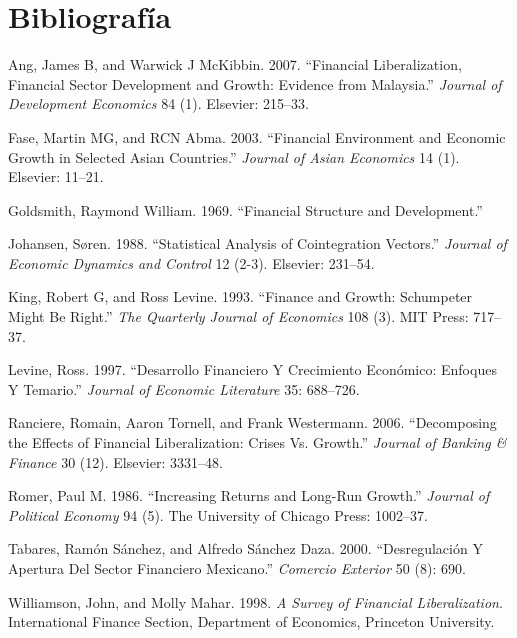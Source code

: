 \documentclass[]{AEA}
\begin{document}



\section{Bibliografía}

\hypertarget{refs}{}
\leavevmode\hypertarget{ref-ang2007financial}{}%
Ang, James B, and Warwick J McKibbin. 2007. ``Financial Liberalization,
Financial Sector Development and Growth: Evidence from Malaysia.''
\emph{Journal of Development Economics} 84 (1). Elsevier: 215--33.

\leavevmode\hypertarget{ref-fase2003financial}{}%
Fase, Martin MG, and RCN Abma. 2003. ``Financial Environment and
Economic Growth in Selected Asian Countries.'' \emph{Journal of Asian
Economics} 14 (1). Elsevier: 11--21.

\leavevmode\hypertarget{ref-goldsmith1969financial}{}%
Goldsmith, Raymond William. 1969. ``Financial Structure and
Development.''

\leavevmode\hypertarget{ref-johansen1988statistical}{}%
Johansen, Søren. 1988. ``Statistical Analysis of Cointegration
Vectors.'' \emph{Journal of Economic Dynamics and Control} 12 (2-3).
Elsevier: 231--54.

\leavevmode\hypertarget{ref-king1993finance}{}%
King, Robert G, and Ross Levine. 1993. ``Finance and Growth: Schumpeter
Might Be Right.'' \emph{The Quarterly Journal of Economics} 108 (3). MIT
Press: 717--37.

\leavevmode\hypertarget{ref-levine1997desarrollo}{}%
Levine, Ross. 1997. ``Desarrollo Financiero Y Crecimiento Económico:
Enfoques Y Temario.'' \emph{Journal of Economic Literature} 35:
688--726.

\leavevmode\hypertarget{ref-ranciere2006decomposing}{}%
Ranciere, Romain, Aaron Tornell, and Frank Westermann. 2006.
``Decomposing the Effects of Financial Liberalization: Crises Vs.
Growth.'' \emph{Journal of Banking \& Finance} 30 (12). Elsevier:
3331--48.

\leavevmode\hypertarget{ref-romer1986increasing}{}%
Romer, Paul M. 1986. ``Increasing Returns and Long-Run Growth.''
\emph{Journal of Political Economy} 94 (5). The University of Chicago
Press: 1002--37.

\leavevmode\hypertarget{ref-tabares2000desregulacion}{}%
Tabares, Ramón Sánchez, and Alfredo Sánchez Daza. 2000. ``Desregulación
Y Apertura Del Sector Financiero Mexicano.'' \emph{Comercio Exterior} 50
(8): 690.

\leavevmode\hypertarget{ref-williamson1998survey}{}%
Williamson, John, and Molly Mahar. 1998. \emph{A Survey of Financial
Liberalization}. International Finance Section, Department of Economics,
Princeton University.
\end{document}
